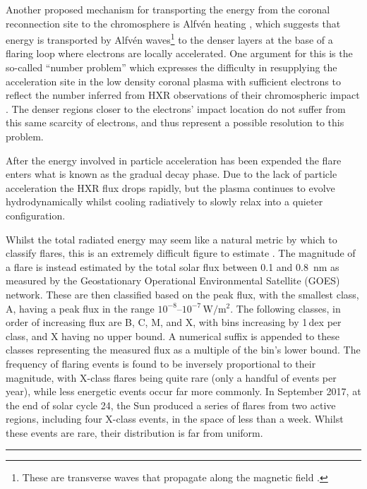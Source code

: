 Another proposed mechanism for transporting the energy from the coronal reconnection site to the chromosphere is Alfvén heating \citep{Emslie1982, Fletcher2007}, which suggests that energy is transported by Alfvén waves\footnote{These  are transverse waves that propagate along the magnetic field \citep[e.g. ][]{TandbergHanssen1988}.} to the denser layers at the base of a flaring loop where electrons are locally accelerated.
One argument for this is the so-called ``number problem'' which expresses the difficulty in resupplying the acceleration site in the low density coronal plasma with sufficient electrons to reflect the number inferred from HXR observations of their chromospheric impact \citep[e.g.][]{Simoes2013}.
The denser regions closer to the electrons' impact location do not suffer from this same scarcity of electrons, and thus represent a possible resolution to this problem.

After the energy involved in particle acceleration has been expended the flare enters what is known as the gradual decay phase.
Due to the lack of particle acceleration the HXR flux drops rapidly, but the plasma continues to evolve hydrodynamically whilst cooling radiatively to slowly relax into a quieter configuration.

Whilst the total radiated energy may seem like a natural metric by which to classify flares, this is an extremely difficult figure to estimate \citep[e.g.][]{Milligan2014}.
The magnitude of a flare is instead estimated by the total solar flux between 0.1 and \SI{0.8}{\nano\metre} as measured by the Geostationary Operational Environmental Satellite (GOES) network.
These are then classified based on the peak flux, with the smallest class, A, having a peak flux in the range $10^{-8}$--$10^{-7}\,\si{\watt\per\square\m}$.
The following classes, in order of increasing flux are B, C, M, and X, with bins increasing by 1\,dex per class, and X having no upper bound.
A numerical suffix is appended to these classes representing the measured flux as a multiple of the bin's lower bound.
The frequency of flaring events is found to be inversely proportional to their magnitude, with X-class flares being quite rare (only a handful of events per year), while less energetic events occur far more commonly.
In September 2017, at the end of solar cycle 24, the Sun produced a series of flares from two active regions, including four X-class events, in the space of less than a week.
Whilst these events are rare, their distribution is far from uniform.

\begin{center}
    \rule{0.5\textwidth}{0.6pt}
\end{center}


